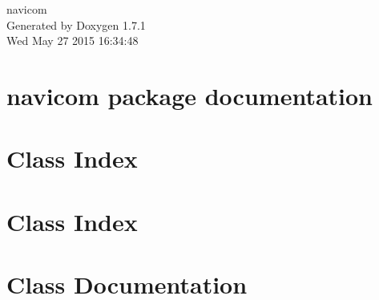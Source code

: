 \documentclass[a4paper]{article}
\begin{document}
\hypersetup{pageanchor=false}
\begin{titlepage}
\vspace*{7cm}
\begin{center}
{\Large navicom }\\
\vspace*{1cm}
{\large Generated by Doxygen 1.7.1}\\
\vspace*{0.5cm}
{\small Wed May 27 2015 16:34:48}\\
\end{center}
\end{titlepage}
\tableofcontents
{}
\hypersetup{pageanchor=true}
\section{navicom package documentation}
\label{index}\hypertarget{index}{}
\section{Class Index}

\section{Class Index}

\section{Class Documentation}





\printindex
\end{document}
